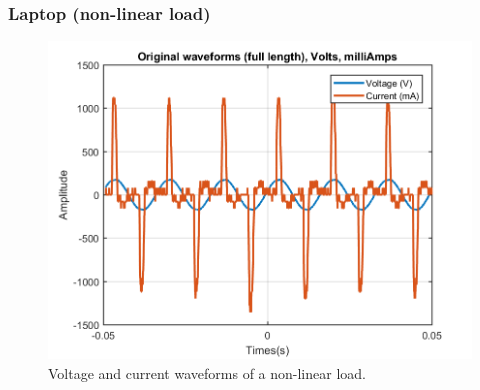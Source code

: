 \documentclass[journal]{IEEEtran}
\begin{document}
\subsubsection{Laptop (non-linear load)}

\begin{figure}[h]
\centering
\includegraphics[clip,width=\columnwidth]{original_waveform_computer.png}
\caption{Voltage and current waveforms of a non-linear load.}
\label{original_no_lineal_load}
\end{figure}
\end{document}

